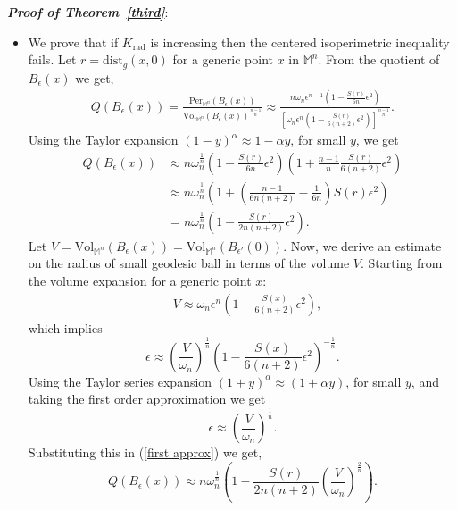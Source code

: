 \documentclass[a4paper,11pt,reqno]{amsart}
\renewcommand\eqref[1]{(\ref{#1})}
\theoremstyle{plain}
\numberwithin{equation}{section} \allowdisplaybreaks
\newcommand{\m}{\mathbb{M}^n}
\newcommand{\uv}{\omega_n}
\begin{document}
\textit{\textbf{Proof of Theorem~\ref{third}}}: 
\begin{itemize}
    \item[(i)] We prove that if $K_{\mathrm{rad}}$ is increasing then the centered isoperimetric inequality fails. Let $r=\text{dist}_g(x,0)$ for a generic point $x$ in $\m$. From the quotient of $B_{\epsilon}(x)$ we get,
    \begin{align*}
        Q(B_{\epsilon}(x))=\frac{\text{Per}_{\m}(B_{\epsilon}(x))}{\text{Vol}_{\m}(B_{\epsilon}(x))^{\frac{n-1}{n}}}
        \approx \frac{n\uv\epsilon^{n-1}\left(1-\frac{S(r)}{6n}\epsilon^2\right)}{\left[\uv \epsilon^n\left(1-\frac{S(r)}{6(n+2)}\epsilon^2\right)\right]^{\frac{n-1}{n}}}.
    \end{align*}
    Using the Taylor expansion $(1-y)^{\alpha}\approx1-\alpha y$, for small $y$, we get
    \begin{align}\label{first approx}
        Q(B_{\epsilon}(x))&\approx n\uv^{\frac{1}{n}}\left(1-\frac{S(r)}{6n}\epsilon^2\right)\left(1+\frac{n-1}{n}\frac{S(r)}{6(n+2)}\epsilon^2\right)\nonumber\\
        &\approx n\uv^{\frac{1}{n}}\left(1+\left(\frac{n-1}{6n(n+2)}-\frac{1}{6n}\right)S(r)\epsilon^2\right)\nonumber\\
        &=n\uv^{\frac{1}{n}}\left(1-\frac{S(r)}{2n(n+2)}\epsilon^2\right). 
    \end{align}
    Let $V=\text{Vol}_{\m}(B_{\epsilon}(x))=\text{Vol}_{\m}(B_{\epsilon'}(0))$. Now, we derive an estimate on the radius of small geodesic ball in terms of the volume $V$. Starting from the volume expansion for a generic point $x$:
    \begin{align*}
       & V\approx \uv \epsilon^n \left(1-\frac{S(x)}{6(n+2)}\epsilon^2\right),
    \end{align*}
    which implies
    \begin{equation*}
        \epsilon\approx \left(\frac{V}{\uv}\right)^{\frac{1}{n}}\left(1-\frac{S(x)}{6(n+2)}\epsilon^2\right)^{-\frac{1}{n}}.
    \end{equation*}
    Using the Taylor series expansion $(1+y)^{\alpha}\approx(1+\alpha y)$, for small $y$, and taking the first order approximation we get 
    \begin{equation*}
        \epsilon\approx \left(\frac{V}{\uv}\right)^{\frac{1}{n}}.
    \end{equation*}
    Substituting this in \eqref{first approx} we get,
    \begin{equation*}
        Q(B_{\epsilon}(x))\approx n\uv^{\frac{1}{n}}\left(1-\frac{S(r)}{2n(n+2)}\left(\frac{V}{\uv}\right)^{\frac{2}{n}}\right).

\end{equation*}
\end{itemize}
\end{document}
